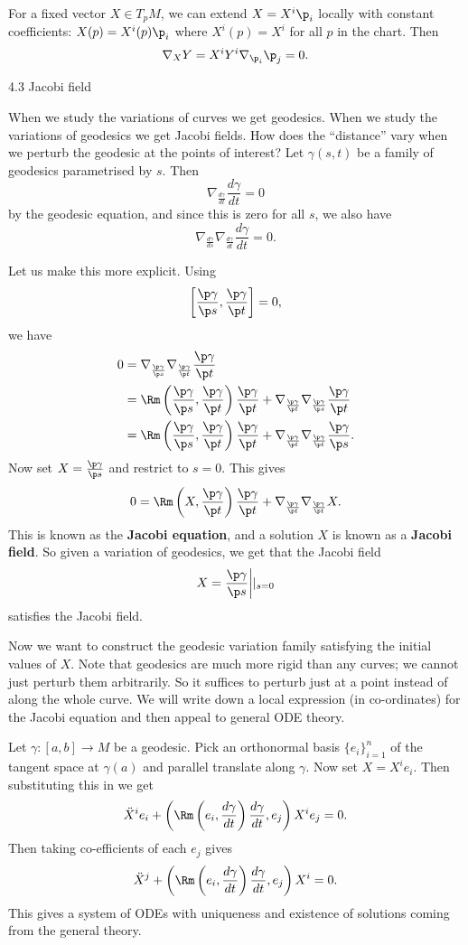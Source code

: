 For a fixed vector $X\in T_pM$, we can extend $X=X^i\p_i$ locally with constant coefficients: $X(p)=X^i(p)\p_i$ where $X^i(p)=X^i$ for all $p$ in the chart.
Then
\[ \nabla_XY= X^iY^i\nabla_{\p_i}\p_j=0. \]

4.3 Jacobi field

When we study the variations of curves we get geodesics.
When we study the variations of geodesics we get Jacobi fields.
How does the ``distance'' vary when we perturb the geodesic at the points of interest?
Let $\gamma(s,t)$ be a family of geodesics parametrised by $s$.
Then
\[ \nabla_{\frac{d\gamma}{dt}}\frac{d\gamma}{dt} = 0 \]
by the geodesic equation, and since this is zero for all $s$, we also have
\[ \nabla_{\frac{d\gamma}{ds}} \nabla_{\frac{d\gamma}{dt}}\frac{d\gamma}{dt} = 0. \]

Let us make this more explicit.
Using
\[ \left[ \frac{\p\gamma}{\p s}, \frac{\p\gamma}{\p t} \right] = 0,\]
we have
\begin{align*}
  0 &= \nabla_{\frac{\p\gamma}{\p s}} \nabla_{\frac{\p\gamma}{\p t}}\frac{\p \gamma}{\p t} \\
  &= \Rm\left( \frac{\p \gamma}{\p s}, \frac{\p \gamma}{\p t} \right) \frac{\p \gamma}{\p t} + \nabla_{\frac{\p\gamma}{\p t}} \nabla_{\frac{\p\gamma}{\p s}} \frac{\p \gamma}{\p t} \\
  &= \Rm\left( \frac{\p \gamma}{\p s}, \frac{\p \gamma}{\p t} \right) \frac{\p \gamma}{\p t} + \nabla_{\frac{\p\gamma}{\p t}} \nabla_{\frac{\p\gamma}{\p t}} \frac{\p \gamma}{\p s}.
\end{align*}
Now set $X=\tfrac{\p\gamma}{\p s}$ and restrict to $s=0$.
This gives
\[ 0 = \Rm\left( X, \frac{\p \gamma}{\p t} \right) \frac{\p \gamma}{\p t} + \nabla_{\frac{\p\gamma}{\p t}} \nabla_{\frac{\p\gamma}{\p t}} X.\]
This is known as the \textbf{Jacobi equation}, and a solution $X$ is known as a \textbf{Jacobi field}.
So given a variation of geodesics, we get that the Jacobi field
\[ X = \frac{\p\gamma}{\p s}\bigg\vert|_{s=0} \]
satisfies the Jacobi field.

Now we want to construct the geodesic variation family satisfying the initial values of $X$.
Note that geodesics are much more rigid than any curves; we cannot just perturb them arbitrarily.
So it suffices to perturb just at a point instead of along the whole curve.
We will write down a local expression (in co-ordinates) for the Jacobi equation and then appeal to general ODE theory.

Let $\gamma:[a,b]\to M$ be a geodesic.
Pick an orthonormal basis $\{e_i\}_{i=1}^n$ of the tangent space at $\gamma(a)$ and parallel translate along $\gamma$.
Now set $X=X^ie_i$.
Then substituting this in we get
\[ \ddot{X}^i e_i + \left( \Rm\left( e_i, \frac{d\gamma}{dt} \right)\frac{d\gamma}{dt}, e_j \right)X^ie_j = 0. \]
Then taking co-efficients of each $e_j$ gives
\[ \ddot{X}^j + \left( \Rm\left( e_i, \frac{d\gamma}{dt} \right)\frac{d\gamma}{dt}, e_j \right)X^i = 0. \]
This gives a system of ODEs with uniqueness and existence of solutions coming from the general theory.

